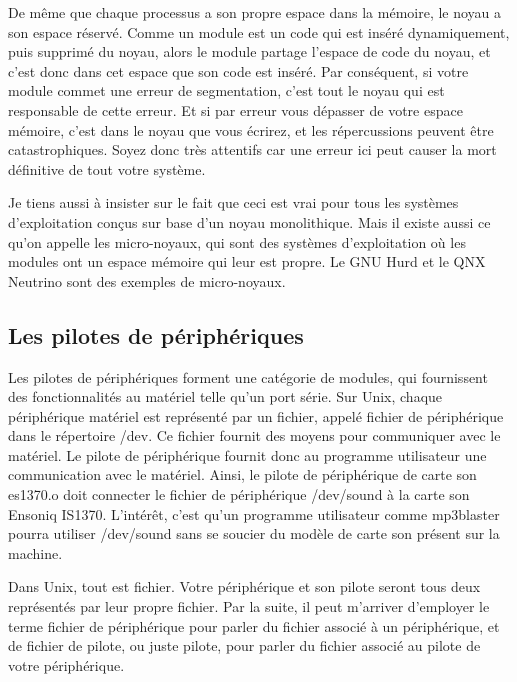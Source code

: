 \documentclass[11pt]{article}
\begin{document}
De même que chaque processus a son propre espace dans la mémoire, le noyau a son espace réservé. Comme un module est un code qui est inséré dynamiquement, puis supprimé du noyau, alors le module partage l'espace de code du noyau, et c'est donc dans cet espace que son code est inséré. Par conséquent, si votre module commet une erreur de segmentation, c'est tout le noyau qui est responsable de cette erreur. Et si par erreur vous dépasser de votre espace mémoire, c'est dans le noyau que vous écrirez, et les répercussions peuvent être catastrophiques. Soyez donc très attentifs car une erreur ici peut causer la mort définitive de tout votre système.

Je tiens aussi à insister sur le fait que ceci est vrai pour tous les systèmes d'exploitation conçus sur base d'un noyau monolithique. Mais il existe aussi ce qu'on appelle les micro-noyaux, qui sont des systèmes d'exploitation où les modules ont un espace mémoire qui leur est propre. Le GNU Hurd et le QNX Neutrino sont des exemples de micro-noyaux.

\subsection*{Les pilotes de périphériques}
\label{sec-5-6}

Les pilotes de périphériques forment une catégorie de modules, qui fournissent des fonctionnalités au matériel telle qu'un port série. Sur Unix, chaque périphérique matériel est représenté par un fichier, appelé fichier de périphérique dans le répertoire /dev. Ce fichier fournit des moyens pour communiquer avec le matériel. Le pilote de périphérique fournit donc au programme utilisateur une communication avec le matériel. Ainsi, le pilote de périphérique de carte son es1370.o doit connecter le fichier de périphérique /dev/sound à la carte son Ensoniq IS1370. L'intérêt, c'est qu'un programme utilisateur comme mp3blaster pourra utiliser /dev/sound sans se soucier du modèle de carte son présent sur la machine.

Dans Unix, tout est fichier. Votre périphérique et son pilote seront tous deux représentés par leur propre fichier. Par la suite, il peut m'arriver d'employer le terme fichier de périphérique pour parler du fichier associé à un périphérique, et de fichier de pilote, ou juste pilote, pour parler du fichier associé au pilote de votre périphérique.
\end{document}

